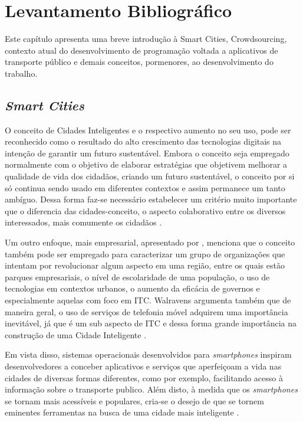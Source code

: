 \chapter{Levantamento Bibliográfico}\label{cap:levbibliog}

Este capítulo apresenta uma breve introdução à Smart Cities, Crowdsourcing, contexto atual do desenvolvimento de programação voltada a aplicativos de transporte público e demais conceitos, pormenores, ao desenvolvimento do trabalho.

\section{\textit{Smart Cities}}

O conceito de Cidades Inteligentes e o respectivo aumento no seu uso, pode ser reconhecido como o resultado do alto crescimento das tecnologias digitais na intenção de garantir um futuro sustentável. Embora o conceito seja empregado normalmente com o objetivo de elaborar estratégias que objetivem melhorar a qualidade de vida dos cidadãos, criando um futuro sustentável, o conceito por si só continua sendo usado em diferentes contextos e assim permanece um tanto ambíguo. Dessa forma faz-se necessário estabelecer um critério muito importante que o diferencia das cidades-conceito, o aspecto colaborativo entre os diversos interessados, mais comumente os cidadãos \cite{schuurman}. 

Um outro enfoque, mais empresarial, apresentado por , menciona que o conceito também pode ser empregado para caracterizar um grupo de organizações que intentam por revolucionar algum aspecto em uma região, entre os quais estão parques empresariais, o nível de escolaridade de uma população, o uso de tecnologias em contextos urbanos, o aumento da eficácia de governos e especialmente aquelas com foco em ITC. Walravens argumenta também que de maneira geral, o uso de serviços de telefonia móvel adquirem uma importância inevitável, já que é um sub aspecto de ITC e dessa forma grande importância na construção de uma Cidade Inteligente \cite{walravens}.

Em vista disso, sistemas operacionais desenvolvidos para \emph{smartphones} inspiram desenvolvedores a conceber aplicativos e serviços que aperfeiçoam a vida nas cidades de diversas formas diferentes, como por exemplo, facilitando acesso à informação sobre o transporte publico. Além disto, à medida que os \emph{smartphones} se tornam mais acessíveis e populares, cria-se o desejo de que se tornem eminentes ferramentas na busca de uma cidade mais inteligente \cite{walravens}.

